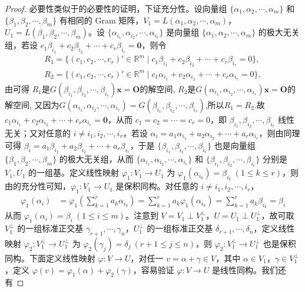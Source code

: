 \documentclass[../../main.tex]{subfiles}
\begin{document}
\begin{proof}
必要性类似于的必要性的证明，下证充分性。设向量组 \(\{\alpha_1,\alpha_2,\cdots,\alpha_m\}\) 和 \(\{\beta_1,\beta_2,\cdots,\beta_m\}\) 有相同的 Gram 矩阵，\(V_1 = L(\alpha_1,\alpha_2,\cdots,\alpha_m)\)，\(U_1 = L(\beta_1,\beta_2,\cdots,\beta_m)\)。设 \(\{\alpha_{i_1},\alpha_{i_2},\cdots,\alpha_{i_r}\}\) 是向量组 \(\{\alpha_1,\alpha_2,\cdots,\alpha_m\}\) 的极大无关组，若设 \(c_1\beta_{i_1} + c_2\beta_{i_2} + \cdots + c_r\beta_{i_r} = \mathbf{0}\)，则令
\begin{align*}
R_1=\{(c_1,c_2,\cdots ,c_r)' \in \mathbb{R} ^m\mid c_1\beta _{i_1}+c_2\beta _{i_2}+\cdots +c_r\beta _{i_r}=0\},
\\
R_2=\{(c_1,c_2,\cdots ,c_r)' \in \mathbb{R} ^m\mid c_1\alpha _{i_1}+c_2\alpha _{i_2}+\cdots +c_r\alpha _{i_r}=0\},
\end{align*}
由可得 $R_1$是$G\left( \beta _{i_1},\beta _{i_2},\cdots ,\beta _{i_r} \right) \boldsymbol{x}=\boldsymbol{O}$的解空间,
$R_2$是$G\left( \alpha _{i_1},\alpha _{i_2},\cdots ,\alpha _{i_r} \right) \boldsymbol{x}=\boldsymbol{O}$的解空间,
又因为$G\left( \alpha _{i_1},\alpha _{i_2},\cdots ,\alpha _{i_r} \right) =G\left( \beta _{i_1},\beta _{i_2},\cdots ,\beta _{i_r} \right)$,所以$R_1=R_2$.故\(c_1\alpha_{i_1} + c_2\alpha_{i_2} + \cdots + c_r\alpha_{i_r} = \mathbf{0}\)，从而 \(c_1 = c_2 = \cdots = c_r = 0\)，即 \(\beta_{i_1},\beta_{i_2},\cdots,\beta_{i_r}\) 线性无关；又对任意的 \(i \neq i_1,i_2,\cdots,i_r\)，若设 \(\alpha_i = a_1\alpha_{i_1} + a_2\alpha_{i_2} + \cdots + a_r\alpha_{i_r}\)，则由同理可得 \(\beta_i = a_1\beta_{i_1} + a_2\beta_{i_2} + \cdots + a_r\beta_{i_r}\)，于是 \(\{\beta_{i_1},\beta_{i_2},\cdots,\beta_{i_r}\}\) 也是向量组 \(\{\beta_1,\beta_2,\cdots,\beta_m\}\) 的极大无关组，从而 \(\{\alpha_{i_1},\alpha_{i_2},\cdots,\alpha_{i_r}\}\) 和 \(\{\beta_{i_1},\beta_{i_2},\cdots,\beta_{i_r}\}\) 分别是 \(V_1,U_1\) 的一组基。定义线性映射 \(\varphi_1:V_1 \to U_1\) 为 \(\varphi_1(\alpha_{i_k}) = \beta_{i_k}\ (1\leqslant  k \leqslant  r)\)，则由的充分性可知，\(\varphi_1:V_1 \to U_1\) 是保积同构。对任意的 \(i \neq i_1,i_2,\cdots,i_r\)，
\begin{align*}
\varphi_1(\alpha_i) &= \varphi_1\left(\sum_{k = 1}^{r}a_k\alpha_{i_k}\right) = \sum_{k = 1}^{r}a_k\varphi_1(\alpha_{i_k}) = \sum_{k = 1}^{r}a_k\beta_{i_k} = \beta_i
\end{align*}
从而 \(\varphi_1(\alpha_i) = \beta_i\ (1\leqslant  i \leqslant  m)\)。注意到 \(V = V_1 \perp V_1^{\perp}\)，\(U = U_1 \perp U_1^{\perp}\)，故可取 \(V_1^{\perp}\) 的一组标准正交基 \(\gamma_{r + 1},\cdots,\gamma_n\)，\(U_1^{\perp}\) 的一组标准正交基 \(\delta_{r + 1},\cdots,\delta_n\)，定义线性映射 \(\varphi_2:V_1^{\perp} \to U_1^{\perp}\) 为 \(\varphi_2(\gamma_j) = \delta_j\ (r + 1\leqslant  j \leqslant  n)\)，则 \(\varphi_2:V_1^{\perp} \to U_1^{\perp}\) 也是保积同构。下面定义线性映射 \(\varphi:V \to U\)，对任一 \(v = \alpha + \gamma \in V\)，其中 \(\alpha \in V_1\)，\(\gamma \in V_1^{\perp}\)，定义 \(\varphi(v) = \varphi_1(\alpha) + \varphi_2(\gamma)\)，容易验证 \(\varphi:V \to U\) 是线性同构。我们还有

\end{proof}
\end{document}
